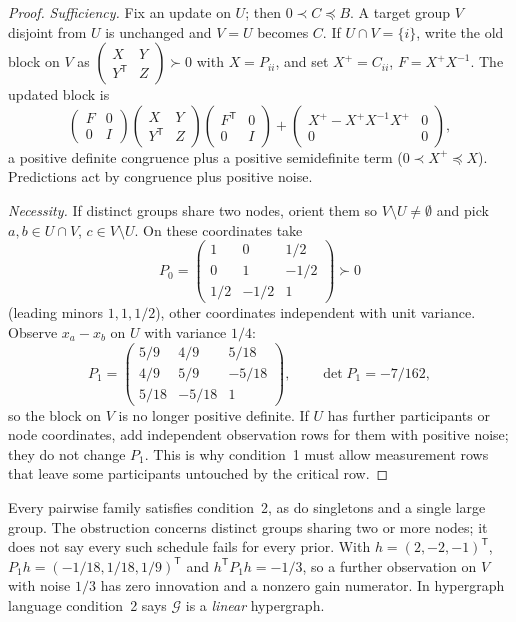 \documentclass[11pt,a4paper]{article}
\numberwithin{equation}{section}
\theoremstyle{remark}\newtheorem{remark}[theorem]{Remark}
\newcommand{\T}{^{\mathsf T}}
\begin{document}
\begin{proof}
\emph{Sufficiency.} Fix an update on $U$; then $0\prec C\preceq B$. A target group $V$ disjoint
from $U$ is unchanged and $V=U$ becomes $C$. If $U\cap V=\{i\}$, write the old block on $V$ as
$\left(\begin{smallmatrix}X&Y\\Y\T&Z\end{smallmatrix}\right)\succ0$ with $X=P_{ii}$, and set
$X^+=C_{ii}$, $F=X^+X^{-1}$. The updated block is
\[
\begin{pmatrix}F&0\\0&I\end{pmatrix}\begin{pmatrix}X&Y\\Y\T&Z\end{pmatrix}\begin{pmatrix}F\T&0\\0&I\end{pmatrix}
+\begin{pmatrix}X^+-X^+X^{-1}X^+&0\\0&0\end{pmatrix},
\]
a positive definite congruence plus a positive semidefinite term ($0\prec X^+\preceq X$).
Predictions act by congruence plus positive noise.

\emph{Necessity.} If distinct groups share two nodes, orient them so $V\setminus U\ne\emptyset$
and pick $a,b\in U\cap V$, $c\in V\setminus U$. On these coordinates take
\[
P_0=\begin{pmatrix}1&0&1/2\\0&1&-1/2\\1/2&-1/2&1\end{pmatrix}\succ0
\]
(leading minors $1,1,1/2$), other coordinates independent with unit variance. Observe
$x_a-x_b$ on $U$ with variance $1/4$:
\[
P_1=\begin{pmatrix}5/9&4/9&5/18\\4/9&5/9&-5/18\\5/18&-5/18&1\end{pmatrix},\qquad\det P_1=-7/162,
\]
so the block on $V$ is no longer positive definite. If $U$ has further participants or node
coordinates, add independent observation rows for them with positive noise; they do not change
$P_1$. This is why condition~1 must allow measurement rows that leave some participants
untouched by the critical row.
\end{proof}

Every pairwise family satisfies condition~2, as do singletons and a single large group. The
obstruction concerns distinct groups sharing two or more nodes; it does not say every such
schedule fails for every prior. With $h=(2,-2,-1)\T$, $P_1h=(-1/18,1/18,1/9)\T$ and
$h\T P_1h=-1/3$, so a further observation on $V$ with noise $1/3$ has zero innovation and a
nonzero gain numerator. In hypergraph language condition~2 says $\mathcal G$ is a
\emph{linear} hypergraph.
\end{document}
